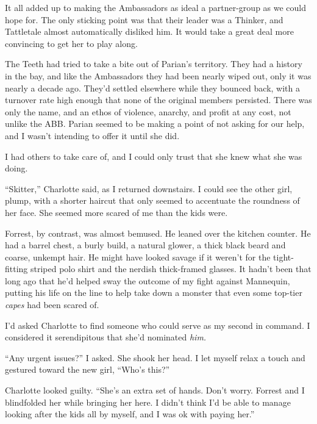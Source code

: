 It all added up to making the Ambassadors as ideal a partner-group as we could hope for.  The only sticking point was that their leader was a Thinker, and Tattletale almost automatically disliked him.  It would take a great deal more convincing to get her to play along.



The Teeth had tried to take a bite out of Parian's territory.  They had a history in the bay, and like the Ambassadors they had been nearly wiped out, only it was nearly a decade ago.  They'd settled elsewhere while they bounced back, with a turnover rate high enough that none of the original members persisted.  There was only the name, and an ethos of violence, anarchy, and profit at any cost, not unlike the ABB.  Parian seemed to be making a point of not asking for our help, and I wasn't intending to offer it until she did.



I had others to take care of, and I could only trust that she knew what she was doing.



``Skitter,'' Charlotte said, as I returned downstairs.  I could see the other girl, plump, with a shorter haircut that only seemed to accentuate the roundness of her face.  She seemed more scared of me than the kids were.



Forrest, by contrast, was almost bemused.  He leaned over the kitchen counter.  He had a barrel chest, a burly build, a natural glower, a thick black beard and coarse, unkempt hair.  He might have looked savage if it weren't for the tight-fitting striped polo shirt and the nerdish thick-framed glasses.  It hadn't been that long ago that he'd helped sway the outcome of my fight against Mannequin, putting his life on the line to help take down a monster that even some top-tier \emph{cape}\emph{s} had been scared of.



I'd asked Charlotte to find someone who could serve as my second in command.  I considered it serendipitous that she'd nominated \emph{him.}



``Any urgent issues?'' I asked.  She shook her head.  I let myself relax a touch and gestured toward the new girl, ``Who's this?''



Charlotte looked guilty.  ``She's an extra set of hands.  Don't worry.  Forrest and I blindfolded her while bringing her here.  I didn't think I'd be able to manage looking after the kids all by myself, and I was ok with paying her.''




